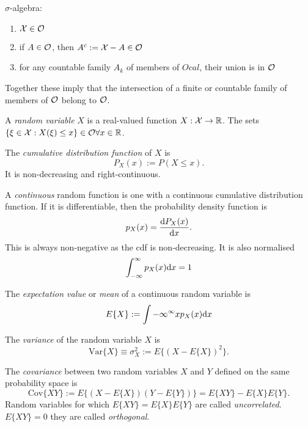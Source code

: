 $\sigma$-algebra:
\begin{enumerate}
\item $\mathcal{X} \in \mathcal{O}$
\item if $A \in \mathcal{O}$, then $A^c := \mathcal{X} - A \in \mathcal{O}$
\item for any countable family $A_k$ of members of $Ocal$, their union is in $\mathcal{O}$
\end{enumerate}
Together these imply that the intersection of a finite or countable family of members of $\mathcal{O}$ belong to $\mathcal{O}$.

A \textit{random variable} $X$ is a real-valued function $X:\mathcal{X} \rightarrow \mathbb{R}$. The sets $\{ \xi \in \mathcal{X} : X(\xi) \leq x \} \in \mathcal{O} \forall x \in \mathbb{R}$.

The \textit{cumulative distribution function} of $X$ is 
\begin{equation}
\label{eq:cdf}
P_X(x) := P(X\leq x).
\end{equation} 
It is non-decreasing and right-continuous.

A \textit{continuous} random function is one with a continuous cumulative distribution function. If it is differentiable, then the probability density  function is 
\begin{equation}
\label{eq:pdf}
p_X(x)=\frac{{\mbox{d}} P_X(x)}{{\mbox{d}} x}.
\end{equation}
This is always non-negative as the cdf is non-decreasing. It is also normalised 
\begin{equation}
\label{eq:pdfNormalised}
\int_{-\infty}^{\infty} p_X(x) {\mbox{d}} x =1
\end{equation}

The \textit{expectation value} or \textit{mean} of a continuous random variable is 
\begin{equation}
\label{eq:expectation}
E\{X\} := \int {-\infty}^{\infty} x p_X(x) {\mbox{d}} x
\end{equation}

The \textit{variance} of the random variable $X$ is 
\begin{equation}
\mbox{Var} \{ X \} \equiv \sigma^2_X := E\{(X-E\{X\})^2\}.
\end{equation}

The \textit{covariance} between two random variables $X$ and $Y$ defined on the same probability space is 
\begin{equation}
\mbox{Cov}\{XY\} := E\{(X-E\{X\})(Y-E\{Y\})\} = E\{XY\}-E\{X\}E\{Y\}.
\end{equation}
Random variables for which $E\{XY\}=E\{X\}E\{Y\}$ are called \textit{uncorrelated}. $E\{XY\}=0$ they are called \textit{orthogonal}.

